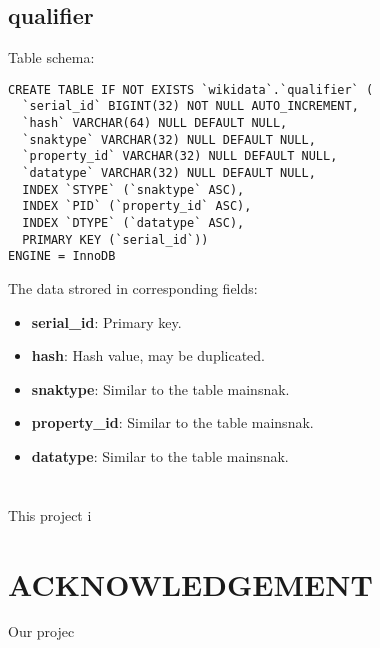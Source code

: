 \documentclass[12pt]{article}
\begin{document}
\subsection{qualifier}
\lstset{language=SQL}
Table schema:
\begin{lstlisting}
CREATE TABLE IF NOT EXISTS `wikidata`.`qualifier` (
  `serial_id` BIGINT(32) NOT NULL AUTO_INCREMENT,
  `hash` VARCHAR(64) NULL DEFAULT NULL,
  `snaktype` VARCHAR(32) NULL DEFAULT NULL,
  `property_id` VARCHAR(32) NULL DEFAULT NULL,
  `datatype` VARCHAR(32) NULL DEFAULT NULL,
  INDEX `STYPE` (`snaktype` ASC),
  INDEX `PID` (`property_id` ASC),
  INDEX `DTYPE` (`datatype` ASC),
  PRIMARY KEY (`serial_id`))
ENGINE = InnoDB
\end{lstlisting}
The data strored in corresponding fields:
\begin{itemize}
\item \textbf{serial\_id}: Primary key.
\item \textbf{hash}: Hash value, may be duplicated.
\item \textbf{snaktype}: Similar to the table mainsnak.
\item \textbf{property\_id}: Similar to the table mainsnak.
\item \textbf{datatype}: Similar to the table mainsnak.
\end{itemize}
\section{}

This project i

\section{ACKNOWLEDGEMENT}

Our projec
\end{document}
